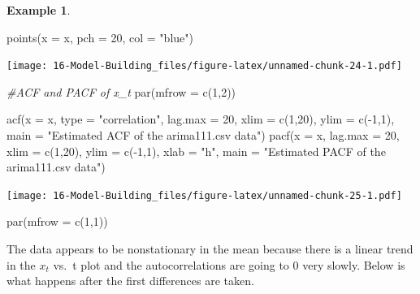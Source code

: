 \documentclass[
]{book}
\newenvironment{Shaded}{\begin{snugshade}}{\end{snugshade}}
\newcommand{\AttributeTok}[1]{\textcolor[rgb]{0.77,0.63,0.00}{#1}}
\newcommand{\CommentTok}[1]{\textcolor[rgb]{0.56,0.35,0.01}{\textit{#1}}}
\newcommand{\DecValTok}[1]{\textcolor[rgb]{0.00,0.00,0.81}{#1}}
\newcommand{\FunctionTok}[1]{\textcolor[rgb]{0.00,0.00,0.00}{#1}}
\newcommand{\NormalTok}[1]{#1}
\newcommand{\SpecialCharTok}[1]{\textcolor[rgb]{0.00,0.00,0.00}{#1}}
\newcommand{\StringTok}[1]{\textcolor[rgb]{0.31,0.60,0.02}{#1}}
\theoremstyle{definition}
\theoremstyle{definition}
\newtheorem{example}{Example}[chapter]
\theoremstyle{definition}
\theoremstyle{definition}
\theoremstyle{remark}
\begin{document}
\begin{example}
\begin{Shaded}
\begin{Highlighting}[]
\FunctionTok{points}\NormalTok{(}\AttributeTok{x =}\NormalTok{ x, }\AttributeTok{pch =} \DecValTok{20}\NormalTok{, }\AttributeTok{col =} \StringTok{"blue"}\NormalTok{)}
\end{Highlighting}
\end{Shaded}

\texttt{[image: 16-Model-Building\_files/figure-latex/unnamed-chunk-24-1.pdf]}

\begin{Shaded}
\begin{Highlighting}[]
\CommentTok{\#ACF and PACF of x\_t}
\FunctionTok{par}\NormalTok{(}\AttributeTok{mfrow =} \FunctionTok{c}\NormalTok{(}\DecValTok{1}\NormalTok{,}\DecValTok{2}\NormalTok{))}

\FunctionTok{acf}\NormalTok{(}\AttributeTok{x =}\NormalTok{ x, }\AttributeTok{type =} \StringTok{"correlation"}\NormalTok{, }\AttributeTok{lag.max =} \DecValTok{20}\NormalTok{, }\AttributeTok{xlim =} 
    \FunctionTok{c}\NormalTok{(}\DecValTok{1}\NormalTok{,}\DecValTok{20}\NormalTok{), }\AttributeTok{ylim =} \FunctionTok{c}\NormalTok{(}\SpecialCharTok{{-}}\DecValTok{1}\NormalTok{,}\DecValTok{1}\NormalTok{), }\AttributeTok{main =} \StringTok{"Estimated ACF of the }
\StringTok{    arima111.csv data"}\NormalTok{)}
\FunctionTok{pacf}\NormalTok{(}\AttributeTok{x =}\NormalTok{ x, }\AttributeTok{lag.max =} \DecValTok{20}\NormalTok{, }\AttributeTok{xlim =} \FunctionTok{c}\NormalTok{(}\DecValTok{1}\NormalTok{,}\DecValTok{20}\NormalTok{), }\AttributeTok{ylim =} 
    \FunctionTok{c}\NormalTok{(}\SpecialCharTok{{-}}\DecValTok{1}\NormalTok{,}\DecValTok{1}\NormalTok{), }\AttributeTok{xlab =} \StringTok{"h"}\NormalTok{, }\AttributeTok{main =} \StringTok{"Estimated PACF of the }
\StringTok{   arima111.csv data"}\NormalTok{)}
\end{Highlighting}
\end{Shaded}

\texttt{[image: 16-Model-Building\_files/figure-latex/unnamed-chunk-25-1.pdf]}

\begin{Shaded}
\begin{Highlighting}[]
\FunctionTok{par}\NormalTok{(}\AttributeTok{mfrow =} \FunctionTok{c}\NormalTok{(}\DecValTok{1}\NormalTok{,}\DecValTok{1}\NormalTok{))}
\end{Highlighting}
\end{Shaded}

The data appears to be nonstationary in the mean because there is a linear trend in the \(x_t\) vs.~t plot and the autocorrelations are going to 0 very slowly. Below is what happens after the first differences are taken.


\end{example}
\end{document}
